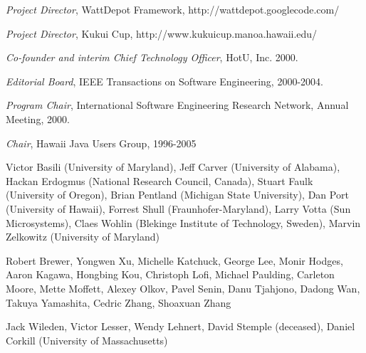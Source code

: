 \begin{Synergistic Activities}
\item {\em Project Director}, WattDepot Framework, http://wattdepot.googlecode.com/
\item {\em Project Director}, Kukui Cup, http://www.kukuicup.manoa.hawaii.edu/
\item {\em Co-founder and interim Chief Technology Officer}, HotU, Inc.  2000.
\item {\em Editorial Board}, IEEE Transactions on Software Engineering, 2000-2004.
\item {\em Program Chair}, International Software Engineering Research Network, Annual Meeting, 2000.
\item {\em Chair}, Hawaii Java Users Group, 1996-2005

\end{Synergistic Activities}


\begin{Collaborators and Co-Editors}
\item Victor Basili (University of Maryland),
Jeff Carver (University of Alabama),
Hackan Erdogmus (National Research Council, Canada), 
Stuart Faulk (University of Oregon),
Brian Pentland (Michigan State University),
Dan Port (University of Hawaii),
Forrest Shull (Fraunhofer-Maryland),
Larry Votta (Sun Microsystems),
Claes Wohlin (Blekinge Institute of Technology, Sweden),
Marvin Zelkowitz (University of Maryland)
\end{Collaborators and Co-Editors}


\begin{Graduate Advisors and Postdoctoral Sponsors}
\item Robert Brewer, Yongwen Xu, Michelle Katchuck, George Lee,
Monir Hodges,
Aaron Kagawa, 
Hongbing Kou,
Christoph Lofi,
Michael Paulding,
Carleton Moore,
Mette Moffett,
Alexey Olkov,
Pavel Senin, 
Danu Tjahjono,
Dadong Wan,
Takuya Yamashita,
Cedric Zhang, 
Shoaxuan Zhang
\end{Graduate Advisors and Postdoctoral Sponsors}

\begin{Thesis Advisor and Postgraduate-Scholar Sponsor}
\item Jack Wileden, 
Victor Lesser, 
Wendy Lehnert, 
David Stemple (deceased), 
Daniel Corkill (University of Massachusetts)
\end{Thesis Advisor and Postgraduate-Scholar Sponsor}














